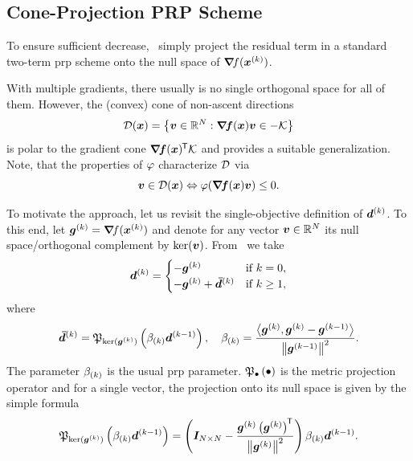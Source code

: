 \documentclass{article}
\theoremstyle{plain}
\theoremstyle{definition}
\begin{document}
\subsection{Cone-Projection PRP Scheme}

To ensure sufficient decrease,~\citet{chengTwoTermPRPBasedDescent2007}
simply project the residual term in a standard two-term \ac{prp}
scheme onto the null space of $\bm{\nabla}\!f(\bm{x}^{(k)})$.

With multiple gradients, there usually is no single orthogonal
space for all of them.
However, the (convex) cone of non-ascent directions
$$
\mathcal D(\bm{x}) = \left\{
	\bm{v} \in \mathbb R^N: \bm{\nabla}\!\bm{f}(\bm{x})\bm{v}
	\in -\mathcal K
\right\}
$$
is polar to the gradient cone $\bm{\nabla}\!\bm{f}(\bm{x})^{\mkern-1.5mu\mathsf{T}}\mathcal K$
and provides a suitable generalization.
Note, that the properties of $\varphi$ characterize $\mathcal D$ via
$$
\bm{v} \in \mathcal D(\bm{x})
\Leftrightarrow
\varphi(\bm{\nabla}\!\bm{f}(\bm{x})\bm{v}) \leq 0.
$$

To motivate the approach, let us revisit the single-objective
definition of $\bm{d}^{(k)}$.
To this end, let $\bm{g}^{(k)} = \bm{\nabla}\!f(\bm{x}^{(k)})$ and denote for any
vector $\bm{v}\in \mathbb R^N$ its null space/orthogonal complement 
by $\operatorname*{ker}(\bm{v})$. From~\cite{chengTwoTermPRPBasedDescent2007} we take
$$
\bm{d}^{(k)} = \begin{cases}
	-\bm{g}^{(k)} &\text{if $k=0$},\\
	-\bm{g}^{(k)} + \bm{\bar{d}}^{(k)}
		&\text{if $k \geq 1$},
	\end{cases}
$$
where 
$$
\bm{\bar{d}}^{(k)} = \mathfrak P_{\operatorname*{ker}(\bm{g}^{(k)})}\left(\beta_{(k)} \bm{d}^{(k-1)}\right),
\quad
\beta_{(k)} = \frac{
	{\left\langle \bm{g}^{(k)}, \bm{g}^{(k)} - \bm{g}^{(k-1)} \right\rangle}}{\left\|\bm{g}^{(k-1)}\right\|^2}.
$$
The parameter $\beta_{(k)}$ is the usual \ac{prp} parameter.
$\mathfrak P_{\bullet}\left(\bullet\right)$ is the metric projection operator and for a single 
vector, the projection onto its null space is given by
the simple formula
$$
\mathfrak P_{\operatorname*{ker}(\bm{g}^{(k)})}\left(\beta_{(k)} \bm{d}^{(k-1)}\right)
=
\left(\bm{I}_{N\times N}
-\frac{\bm{g}^{(k)}\left(\bm{g}^{(k)}\right)^{\mkern-1.5mu\mathsf{T}}}{\left\|\bm{g}^{(k)}\right\|^2}
\right)
\beta_{(k)} \bm{d}^{(k-1)}.
$$
\end{document}
